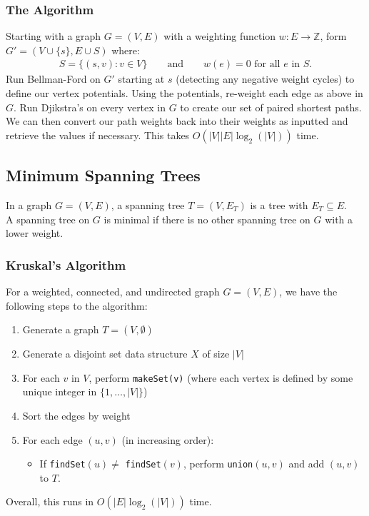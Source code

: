 \subsubsection{The Algorithm}

Starting with a graph $G = (V, E)$ with a weighting function $w : E \to \mathbb{Z}$,
form $G' = (V \cup \{s\}, E \cup S)$ where: \begin{gather*}
  S = \{(s, v) : v \in V\} \qquad \text{and} \qquad w(e) = 0 \text{ for all } e \text{ in } S.
\end{gather*} Run Bellman-Ford on $G'$ starting at $s$ (detecting any negative weight cycles)
to define our vertex potentials. Using the potentials, re-weight each edge as above
in $G$. Run Djikstra's on every vertex in $G$ to create our set of paired shortest paths.
We can then convert our path weights back into their weights as inputted and retrieve the
values if necessary. This takes $O(|V||E|\log_2(|V|))$ time.

\subsection{Minimum Spanning Trees}

In a graph $G = (V, E)$, a spanning tree $T = (V, E_T)$ is a tree
with $E_T \subseteq E$.
\\[\baselineskip]
A spanning tree on $G$ is minimal if there is no other spanning tree
on $G$ with a lower weight.

\subsubsection{Kruskal's Algorithm}

For a weighted, connected, and undirected graph $G = (V, E)$, we have 
the following steps to the algorithm: \begin{enumerate}
  \item Generate a graph $T = (V, \emptyset)$
  \item Generate a disjoint set data structure $X$ of size $|V|$
  \item For each $v$ in $V$, perform \texttt{makeSet(v)} (where
  each vertex is defined by some unique integer in $\{1, \ldots, |V|\}$)
  \item Sort the edges by weight
  \item For each edge $(u, v)$ (in increasing order): \begin{itemize}
    \item If \texttt{findSet}$(u) \neq$ \texttt{findSet}$(v)$,
    perform \texttt{union}$(u, v)$ and add $(u, v)$ to $T$.
  \end{itemize}
\end{enumerate} Overall, this runs in $O(|E| \log_2(|V|))$ time.
